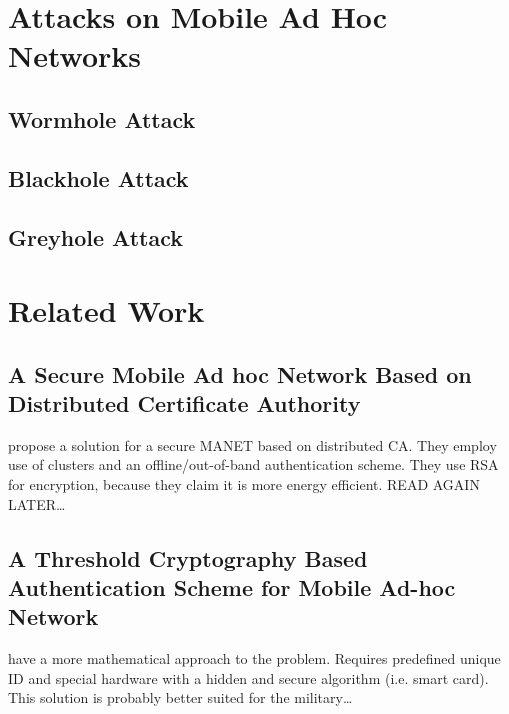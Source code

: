 

\section{Attacks on Mobile Ad Hoc Networks}
\subsection{Wormhole Attack}
\subsection{Blackhole Attack}
\subsection{Greyhole Attack}

\section{Related Work}

\subsection{A Secure Mobile Ad hoc Network Based on Distributed Certificate
Authority}
\cite{hosseinisecure} propose a solution for a secure MANET based on distributed
CA. They employ use of clusters and an offline/out-of-band authentication
scheme. They use RSA for encryption, because they claim it is more energy
efficient. READ AGAIN LATER\ldots

\subsection{A Threshold Cryptography Based Authentication Scheme for Mobile
Ad-hoc Network}
\cite{springerlink:Haimabati} have a more mathematical approach
to the problem. Requires predefined unique ID and special hardware with a hidden
and secure algorithm (i.e. smart card). This solution is probably better suited
for the military\ldots

